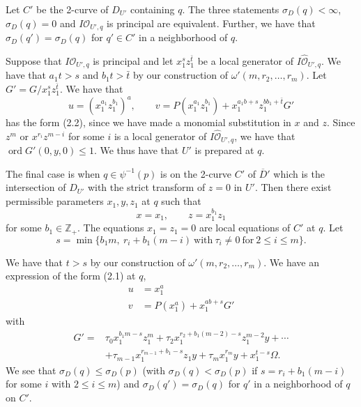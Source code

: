 \documentclass[11pt]{article}
\newcommand{\OO}{\mathcal{O}}                  %
\newcommand{\OH}{\widehat{\mathcal{O}}}        %
\newcommand{\Dbar}{\overline{D}}               %
\newcommand{\tbar}{\bar{t}}                    %
\newcommand{\ord}{\operatorname{ord}}
\begin{document}
Let $C'$ be the 2-curve of $D_{U'}$ containing $q$. The three statements
$\sigma_D(q) < \infty$, $\sigma_D(q) = 0$ and $I\OO_{U',q}$ is principal are equivalent.
Further, we have that $\sigma_D(q') = \sigma_D(q)$ for $q' \in C'$ in a neighborhood of
$q$.

Suppose that $I\OO_{U',q}$ is principal and let $x_1^s z_1^{\tbar}$ be a local generator of
$I\OH_{U',q}$. We have that $a_1 t > s$ and $b_1 t > \tbar$ by our construction of
$\omega'(m, r_2, \dots, r_m)$. Let $G' = G / x_1^s z_1^{\tbar}$. We have that
\[
u = (x_1^{a_1} z_1^{b_1})^a, \qquad v = P(x_1^{a_1} z_1^{b_1}) + x_1^{a_1 b + s} z_1^{b b_1 + \tbar} G'
\]
has the form (2.2), since we have made a monomial substitution in $x$ and $z$. Since
$z^m$ or $x^{r_i} z^{m-i}$ for some $i$ is a local generator of $I\OH_{U',q}$, we have
that $\ord G'(0, y, 0) \leqslant 1$. We thus have that $U'$ is prepared at $q$.

The final case is when $q \in \psi^{-1}(p)$ is on the 2-curve $C'$ of $\Dbar'$ which is
the intersection of $D_{U'}$ with the strict transform of $z = 0$ in $U'$. Then there
exist permissible parameters $x_1, y, z_1$ at $q$ such that
\begin{equation}
\tag{c16}
x = x_1, \qquad z = x_1^{b_1} z_1
\end{equation}
for some $b_1 \in \mathbb{Z}_+$. The equations $x_1 = z_1 = 0$ are local equations of
$C'$ at $q$. Let
\[
s = \min \{ b_1 m,\ r_i + b_1 (m - i) \ \text{with}\ \tau_i \neq 0 \ \text{for}\ 2 \leqslant i \leqslant m \}.
\]


We have that $t > s$ by our construction of $\omega'(m, r_2, \dots, r_m)$. We have an
expression of the form (2.1) at $q$,
\begin{align*}
u &= x_1^a \\
v &= P(x_1^a) + x_1^{a b + s} G'
\end{align*}
with
\begin{align*}
G' = {} & \tau_0 x_1^{b_1 m - s} z_1^m + \tau_2 x_1^{r_2 + b_1 (m-2) - s} z_1^{m-2} y + \cdots \\
        & + \tau_{m-1} x_1^{r_{m-1} + b_1 - s} z_1 y + \tau_m x_1^{r_m} y + x_1^{t - s} \Omega .
\end{align*}
We see that $\sigma_D(q) \leqslant \sigma_D(p)$ (with $\sigma_D(q) < \sigma_D(p)$ if
$s = r_i + b_1 (m - i)$ for some $i$ with $2 \leqslant i \leqslant m$) and
$\sigma_D(q') = \sigma_D(q)$ for $q'$ in a neighborhood of $q$ on $C'$.
\end{document}
